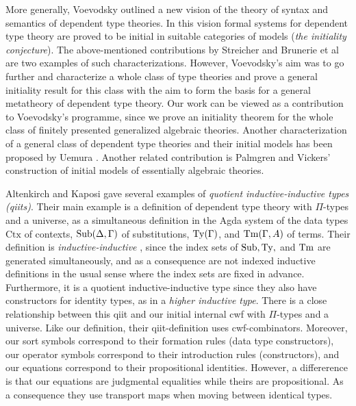 \documentclass{mscs}
\def\Ctx{\mathrm{Ctx}}
\begin{document}
More generally, Voevodsky \cite{voevodsky:initiality} outlined a new vision of the theory of syntax and semantics of dependent type theories. In this vision formal systems for dependent type theory are proved to be initial in suitable categories of models ({\em the initiality conjecture}). The above-mentioned contributions by Streicher and Brunerie et al are two examples of such characterizations. However, Voevodsky's aim was to go further and characterize a whole class of type theories and prove a general initiality result for this class with the aim to form the basis for a general metatheory of dependent type theory. Our work can be viewed as a contribution to Voevodsky's programme, since we prove an initiality theorem for the whole class of finitely presented generalized algebraic theories. Another characterization of a general class of dependent type theories and their initial models has been proposed by Uemura \cite{uemura:general-framework}. Another related contribution is Palmgren and Vickers' \cite{palmgrenvickers} construction of initial models of essentially algebraic theories.

Altenkirch and Kaposi \cite{altenkirch:qiits} gave several examples of {\em quotient inductive-inductive types (qiits)}. Their main example is a definition of dependent type theory with $\Pi$-types and a universe, as a simultaneous definition in the Agda system \cite{agda-wiki} of the data types $\Ctx$ of contexts, $\mathrm{Sub}(\Delta,\Gamma)$ of substitutions, $\mathrm{Ty}(\Gamma)$, and $\mathrm{Tm}(\Gamma,A)$ of terms. Their definition is {\em inductive-inductive} \cite{nordvallforsberg:iids}, since the index sets of $\mathrm{Sub}, \mathrm{Ty},$ and $\mathrm{Tm}$ are generated simultaneously, and as a consequence are not indexed inductive definitions in the usual sense where the index sets are fixed in advance. Furthermore, it is a quotient inductive-inductive type since they also have constructors for identity types, as in a {\em higher inductive type}.
There is a close relationship between this qiit and our initial internal cwf with $\Pi$-types and a universe. Like our definition, their qiit-definition uses cwf-combinators. Moreover, our sort symbols correspond to their formation rules (data type constructors), our operator symbols correspond to their introduction rules (constructors), and our equations correspond to their propositional identities. However, a differerence is that our equations are judgmental equalities while theirs are propositional. As a consequence they use transport maps when moving between identical types.
\end{document}
